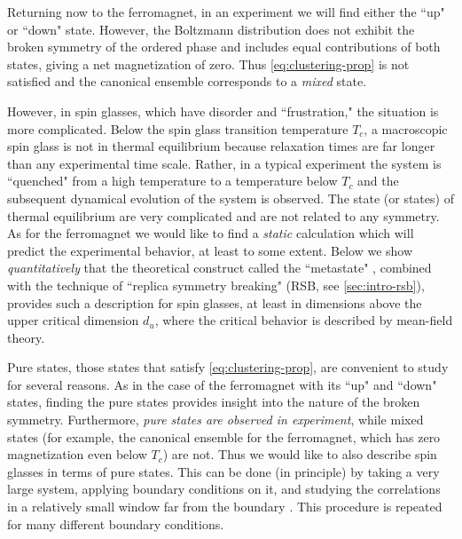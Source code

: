 Returning now to the ferromagnet, in an experiment we will find either the
``up" or ``down" state. However, the Boltzmann distribution does not exhibit
the broken symmetry of the ordered phase and includes equal contributions of
both states, giving a net magnetization of zero. Thus \cref{eq:clustering-prop}
is not satisfied and the canonical ensemble corresponds to a \emph{mixed}
state.

However, in spin glasses, which have disorder and ``frustration," the situation
is more complicated. Below the spin glass transition temperature $T_c$, a
macroscopic spin glass is not in thermal equilibrium because relaxation times
are far longer than any experimental time scale. Rather, in a typical
experiment the system is ``quenched" from a high temperature to a temperature
below $T_c$ and the subsequent dynamical evolution of the system is observed.
The state (or states) of thermal equilibrium are very complicated and are not
related to any symmetry.
As for the ferromagnet we would like to find a \emph{static} calculation which
will predict the experimental behavior, at least to some extent. Below we show
\emph{quantitatively} that the theoretical construct called the ``metastate"
\autocite{newman1997metastate,aizenman1990rounding},
combined with the technique of ``replica symmetry breaking" (RSB, see
\cref{sec:intro-rsb}), provides such a description for spin glasses, at least in
dimensions above the upper critical dimension $d_u$, where the critical
behavior is described by mean-field theory.

Pure states, those states that satisfy \cref{eq:clustering-prop}, are
convenient to study for several reasons. As in the case of the ferromagnet with
its ``up" and ``down" states, finding the pure states provides insight into the
nature of the broken symmetry. Furthermore, \emph{pure states are observed in
  experiment}, while mixed states (for example, the canonical ensemble for the
ferromagnet, which has zero magnetization even below $T_c$) are not. Thus we
would like to also describe spin glasses in terms of pure states. This can be
done (in principle) by taking a very large system, applying boundary conditions
on it, and studying the correlations in a relatively small window far from the
boundary \autocite{newman2003ordering,read2014short}. This procedure is
repeated for many different boundary conditions.

